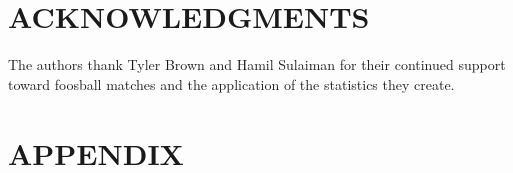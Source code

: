 \documentclass[letterpaper, 10 pt, conference]{ieeeconf}  %
\begin{document}



\section*{ACKNOWLEDGMENTS}
The authors thank Tyler Brown and Hamil Sulaiman for their continued support
toward foosball matches and the application of the statistics they create.





\onecolumn
\section*{APPENDIX}
\setcounter{section}{0}
\end{document}
